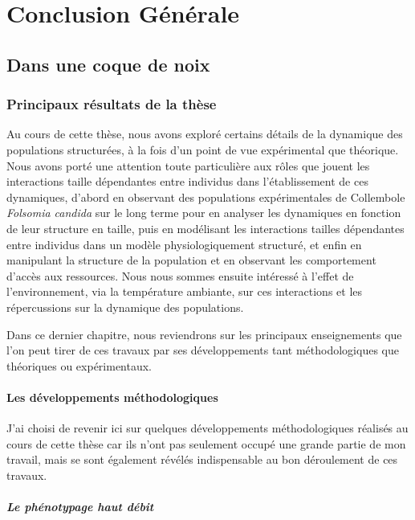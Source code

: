 \part{Conclusion Générale}

\chapter{Dans une coque de noix}

\section{Principaux résultats de la thèse}

Au cours de cette thèse, nous avons exploré certains détails de la dynamique des
populations structurées, à la fois d'un point de vue expérimental que théorique.
Nous avons porté une attention toute particulière aux rôles que jouent les
interactions taille dépendantes entre individus dans l'établissement de ces
dynamiques, d'abord en observant des populations expérimentales de Collembole
\textit{Folsomia candida} sur le long terme pour en analyser les dynamiques en
fonction de leur structure en taille, puis en modélisant les interactions
tailles dépendantes entre individus dans un modèle physiologiquement structuré,
et enfin en manipulant la structure de la population et en observant les
comportement d'accès aux ressources. Nous nous sommes ensuite intéressé à
l'effet de l'environnement, via la température ambiante, sur ces interactions et
les répercussions sur la dynamique des populations.

Dans ce dernier chapitre, nous reviendrons sur les principaux enseignements que
l'on peut tirer de ces travaux par ses développements tant méthodologiques que
théoriques ou expérimentaux.

\subsection{Les développements méthodologiques}

J'ai choisi de revenir ici sur quelques développements méthodologiques réalisés
au cours de cette thèse car ils n'ont pas seulement occupé une grande partie de
mon travail, mais se sont également révélés indispensable au bon déroulement de
ces travaux. 

\subsubsection{Le phénotypage haut débit}

